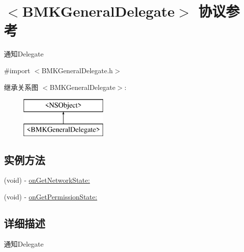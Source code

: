 \hypertarget{protocol_b_m_k_general_delegate-p}{\section{$<$B\-M\-K\-General\-Delegate$>$ 协议参考}
\label{protocol_b_m_k_general_delegate-p}
}


通知\-Delegate  




{\ttfamily \#import $<$B\-M\-K\-General\-Delegate.\-h$>$}

继承关系图 $<$B\-M\-K\-General\-Delegate$>$\-:\begin{figure}[H]
\begin{center}
\leavevmode
\includegraphics[height=2.000000cm]{protocol_b_m_k_general_delegate-p}
\end{center}
\end{figure}
\subsection*{实例方法}
\begin{DoxyCompactItemize}
\item 
(void) -\/ \hyperlink{protocol_b_m_k_general_delegate-p_ad30d0a4dc9bb54cda10cb892ed769491}{on\-Get\-Network\-State\-:}
\item 
(void) -\/ \hyperlink{protocol_b_m_k_general_delegate-p_ab0c34f007a8be34196fc81f2c7b3cddb}{on\-Get\-Permission\-State\-:}
\end{DoxyCompactItemize}


\subsection{详细描述}
通知\-Delegate 

